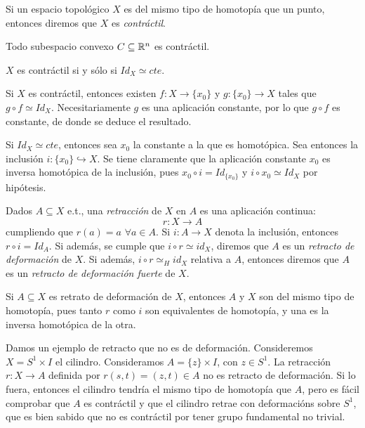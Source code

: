 \documentclass[HS.tex]{subfiles}
\begin{document}
\begin{defi}
Si un espacio topológico $X$ es del mismo tipo de homotopía que un punto, entonces diremos que $X$ es \emph{contráctil}.
\end{defi}
\begin{ej}
Todo subespacio convexo $C \subseteq \mathbb{R}^n$ es contráctil.
\end{ej}
\begin{prop}
$X$ es contráctil si y sólo si $Id_X \simeq cte$.
\end{prop}
\begin{dem}
Si $X$ es contráctil, entonces existen $f:X\to \{x_0\}$ y $g:\{x_0\}\to X$ tales que $g\circ f\simeq Id_X$. Necesitariamente $g$ es una aplicación constante, por lo que $g\circ f$ es constante, de donde se deduce el resultado.

Si $Id_X \simeq cte$, entonces sea $x_0$ la constante a la que es homotópica. Sea entonces la inclusión $i:\{x_0\}\hookrightarrow X$. Se tiene claramente que la aplicación constante $x_0$ es inversa homotópica de la inclusión, pues $x_0\circ i=Id_{\{x_0\}}$ y $i\circ x_0\simeq Id_X$ por hipótesis. \QED
\end{dem}

\begin{defi}
Dados $A \subseteq X$ e.t., una \emph{retracción} de $X$ en $A$ es una aplicación continua:
\[ r \colon X \to A \]
cumpliendo que $r(a) = a$ $\forall a \in A$.
Si $i \colon A \to X$ denota la inclusión, entonces $r \circ i = Id_A$.
Si además, se cumple que $i \circ r \simeq id_X$, diremos que $A$ es un \emph{retracto de deformación} de $X$.
Si además, $i \circ r \simeq_H id_X$ relativa a $A$, entonces diremos que $A$ es un \emph{retracto de deformación fuerte} de $X$.
\end{defi}

\begin{nota}
Si $A \subseteq X$ es retrato de deformación de $X$, entonces $A$ y $X$ son del mismo tipo de homotopía, pues tanto $r$ como $i$ son equivalentes de homotopía, y una es la inversa homotópica de la otra.
\end{nota}
\begin{ej}
Damos un ejemplo de retracto que no es de deformación.
Consideremos $X = S^1 \times I$ el cilindro. Consideramos $A = \{z\} \times I$, con $z \in S^1$.
La retracción $r \colon X \to A$ definida por $r(s,t) = (z,t) \in A$ no es retracto de deformación. Si lo fuera, entonces el cilindro tendría el mismo tipo de homotopía que $A$, pero es fácil comprobar que $A$ es contráctil y que el cilindro retrae con deformacións sobre $S^1$, que es bien sabido que no es contráctil por tener grupo fundamental no trivial.
\end{ej}
\end{document}

